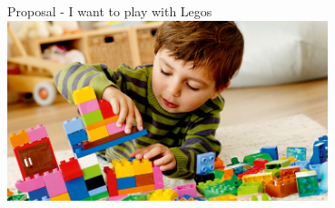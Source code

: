 




\begin{frame}{Proposal - I want to play with Legos}
    \centering
    \includegraphics[height=0.7\textheight,width=0.7\textwidth,keepaspectratio]{images/fishsense-lego.jpg}
\end{frame}

